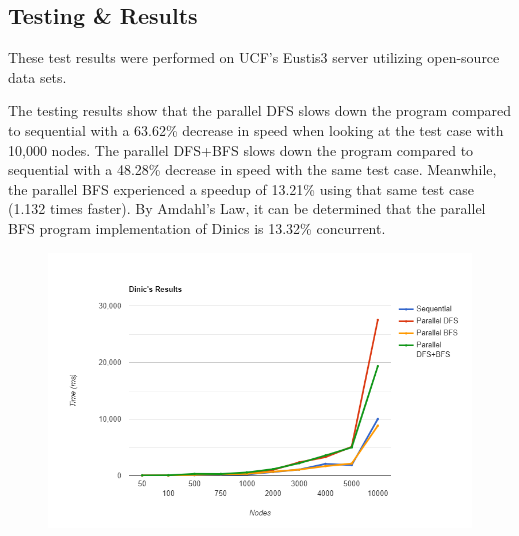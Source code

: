 \subsection{Testing \& Results}
    These test results were performed on UCF's Eustis3 server utilizing open-source data sets.\\ \cite{sumitpadhiyar}
    
    The testing results show that the parallel DFS slows down the program compared to sequential with a 63.62\% decrease in speed when looking at the test case with 10,000 nodes. The parallel DFS+BFS slows down the program compared to sequential with a 48.28\% decrease in speed with the same test case. Meanwhile, the parallel BFS experienced a speedup of 13.21\% using that same test case (1.132 times faster). By Amdahl's Law, it can be determined that the parallel BFS program implementation of Dinics is 13.32\% concurrent.
    
    \newline
    \begin{figure}[H]
        \centering
        \includegraphics[scale=.36]{figures/line-graph_7.png}
        \label{fig:my_label}
    \end{figure}
    
